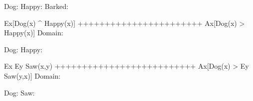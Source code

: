         Dog:    
        Happy:  
        Barked: 
        \endfirstordermodel
        \endanswer

\argument
 Ex[Dog(x) ^ Happy(x)]
+++++++++++++++++++++++
 Ax[Dog(x) > Happy(x)]
\endargument
        \answer
        \firstordermodel
        Domain: 

        Dog:    
        Happy:  
        \endfirstordermodel
        \endanswer

\argument
 Ex Ey Saw(x,y)
++++++++++++++++++++++++++
 Ax[Dog(x) > Ey Saw(y,x)]
\endargument
        \answer
        \firstordermodel
        Domain: 

        Dog:    
        Saw:    
        \endfirstordermodel
        \endanswer

\endproblems
\bye
